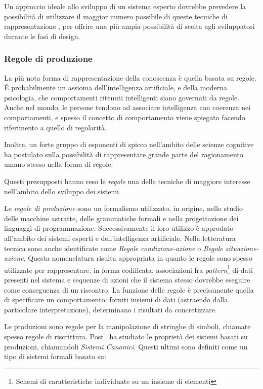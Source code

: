 Un approccio ideale allo sviluppo di un sistema esperto dovrebbe prevedere la possibilità di utilizzare il maggior numero possibile di queste tecniche di rappresentazione \cite{development1993}, per offrire una più ampia possibilità di scelta agli sviluppatori durante le fasi di design.

\subsubsection{Regole di produzione}
La più nota forma di rappresentazione della conoscenza è quella basata su regole. \'E probabilmente un assioma dell'intelligenza artificiale, e della moderna psicologia, che comportamenti ritenuti intelligenti siano governati da regole. Anche nel mondo, le persone tendono ad associare intelligenza con coerenza nei comportamenti, e spesso il concetto di comportamento viene spiegato facendo riferimento a quello di regolarità.~\cite{jackson1999}

Inoltre, un forte gruppo di esponenti di spicco nell'ambito delle scienze cognitive ha postulato sulla possibilità di rappresentare grande parte del ragionamento umano stesso nella forma di regole.~\cite{anderson1993rules}

Questi presupposti hanno reso le \emph{regole} una delle tecniche di maggiore interesse nell'ambito dello sviluppo dei sistemi.

Le \emph{regole di produzione} sono un formalismo utilizzato, in origine, nello studio delle macchine astratte, delle grammatiche formali e nella progettazione dei linguaggi di programmazione. Successivamente il loro utilizzo è approdato all'ambito dei sistemi esperti e dell'intelligenza artificiale. Nella letteratura tecnica sono anche identificate come \emph{Regole condizione-azione} o \emph{Regole situazione-azione}. Questa nomenclatura risulta appropriata in quanto le regole sono spesso utilizzate per rappresentare, in forma codificata, associazioni fra \emph{pattern}\footnote{Schemi di caratteristiche individuate su un insieme di elementi} di dati presenti nel sistema e sequenze di azioni che il sistema stesso dovrebbe eseguire come conseguenza di un riscontro. La funzione delle regole è precisamente quella di specificare un comportamento: forniti insiemi di dati (astraendo dalla particolare interpretazione), determinano i risultati da concretizzare.

Le produzioni sono regole per la manipolazione di stringhe di simboli, chiamate spesso regole di riscrittura. Post~\cite{post1943} ha studiato le proprietà dei sistemi basati su produzioni, chiamandoli \emph{Sistemi Canonici}. Questi ultimi sono definiti come un tipo di sistemi formali basato su:

